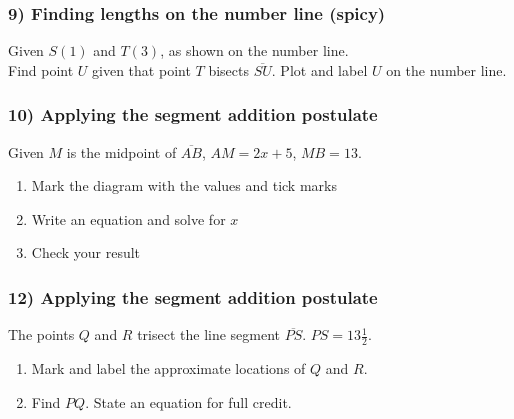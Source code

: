 \documentclass{beamer}
\begin{document}
  \frame
  {
    \frametitle{9) Finding lengths on the number line (spicy)}
    Given $S(1)$ and $T(3)$, as shown on the number line. \\[0.25cm]
    Find point $U$ given that point $T$ bisects $\overline{SU}$. Plot and label $U$ on the number line.\\[0.5cm]
       \vspace{4cm}  
  }

  \frame
  {
    \frametitle{10) Applying the segment addition postulate}
    Given $M$ is the midpoint of $\overline{AB}$, $AM=2x+5$, $MB=13$.
    \begin{enumerate}
      \item Mark the diagram with the values and tick marks
      \item Write an equation and solve for $x$
      \item Check your result
    \end{enumerate} \vspace{1cm}
      \begin{center}
      \end{center} \vspace{4cm}
  }

  \frame
  {
    \frametitle{12) Applying the segment addition postulate}
      The points $Q$ and $R$ trisect the line segment $\overline{PS}$. $PS=13 \frac{1}{2}$.
      \begin{enumerate}
        \item Mark and label the approximate locations of $Q$ and $R$.
        \item Find ${PQ}$. State an equation for full credit.
      \end{enumerate} \vspace{1cm} 
      \begin{center}
      \end{center} \vspace{3cm} 
  }
\end{document}
